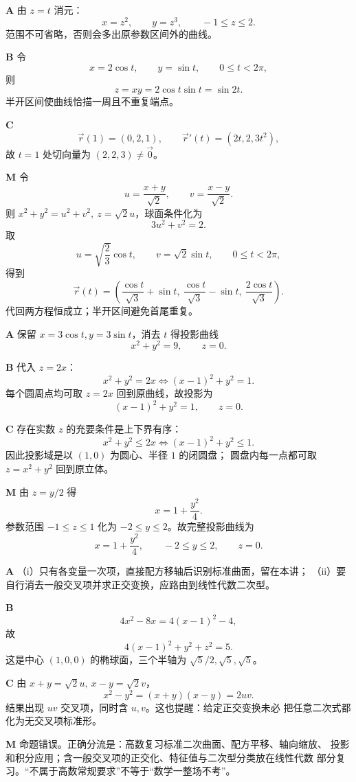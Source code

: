 \begin{solutionBox}
\textbf{A}\quad
由 \(z=t\) 消元：
\[
x=z^2,\qquad y=z^3,\qquad -1\le z\le2.
\]
范围不可省略，否则会多出原参数区间外的曲线。

\textbf{B}\quad
令
\[
x=2\cos t,\qquad y=\sin t,\qquad 0\le t<2\pi,
\]
则
\[
z=xy=2\cos t\sin t=\sin2t.
\]
半开区间使曲线恰描一周且不重复端点。

\textbf{C}\quad
\[
\vec r(1)=(0,2,1),\qquad
\vec r'(t)=(2t,2,3t^2),
\]
故 \(t=1\) 处切向量为 \((2,2,3)\ne\vec0\)。

\textbf{M}\quad
令
\[
u=\frac{x+y}{\sqrt2},\qquad v=\frac{x-y}{\sqrt2}.
\]
则 \(x^2+y^2=u^2+v^2,\ z=\sqrt2u\)，球面条件化为
\[
3u^2+v^2=2.
\]
取
\[
u=\sqrt{\frac23}\cos t,\qquad v=\sqrt2\sin t,\qquad
0\le t<2\pi,
\]
得到
\[
\vec r(t)=\left(
\frac{\cos t}{\sqrt3}+\sin t,\
\frac{\cos t}{\sqrt3}-\sin t,\
\frac{2\cos t}{\sqrt3}
\right).
\]
代回两方程恒成立；半开区间避免首尾重复。
\end{solutionBox}

\begin{solutionBox}
\textbf{A}\quad
保留 \(x=3\cos t,y=3\sin t\)，消去 \(t\) 得投影曲线
\[
x^2+y^2=9,\qquad z=0.
\]

\textbf{B}\quad
代入 \(z=2x\)：
\[
x^2+y^2=2x
\Longleftrightarrow (x-1)^2+y^2=1.
\]
每个圆周点均可取 \(z=2x\) 回到原曲线，故投影为
\[
(x-1)^2+y^2=1,\qquad z=0.
\]

\textbf{C}\quad
存在实数 \(z\) 的充要条件是上下界有序：
\[
x^2+y^2\le2x
\Longleftrightarrow (x-1)^2+y^2\le1.
\]
因此投影域是以 \((1,0)\) 为圆心、半径 \(1\) 的闭圆盘；
圆盘内每一点都可取 \(z=x^2+y^2\) 回到原立体。

\textbf{M}\quad
由 \(z=y/2\) 得
\[
x=1+\frac{y^2}{4}.
\]
参数范围 \(-1\le z\le1\) 化为 \(-2\le y\le2\)。故完整投影曲线为
\[
x=1+\frac{y^2}{4},\qquad -2\le y\le2,\qquad z=0.
\]
\end{solutionBox}

\answerAnchor{MATH1-CALC-0080}
\begin{solutionBox}
\textbf{A}\quad
（i）只有各变量一次项，直接配方移轴后识别标准曲面，留在本讲；
（ii）要自行消去一般交叉项并求正交变换，应路由到线性代数二次型。

\textbf{B}\quad
\[
4x^2-8x=4(x-1)^2-4,
\]
故
\[
4(x-1)^2+y^2+z^2=5.
\]
这是中心 \((1,0,0)\) 的椭球面，三个半轴为
\(\sqrt5/2,\sqrt5,\sqrt5\)。

\textbf{C}\quad
由 \(x+y=\sqrt2u,\ x-y=\sqrt2v\)，
\[
x^2-y^2=(x+y)(x-y)=2uv.
\]
结果出现 \(uv\) 交叉项，同时含 \(u,v\)。这也提醒：给定正交变换未必
把任意二次式都化为无交叉项标准形。

\textbf{M}\quad
命题错误。正确分流是：高数复习标准二次曲面、配方平移、轴向缩放、
投影和积分应用；含一般交叉项的正交化、特征值与二次型分类放在线性代数
部分复习。“不属于高数常规要求”不等于“数学一整场不考”。
\end{solutionBox}
